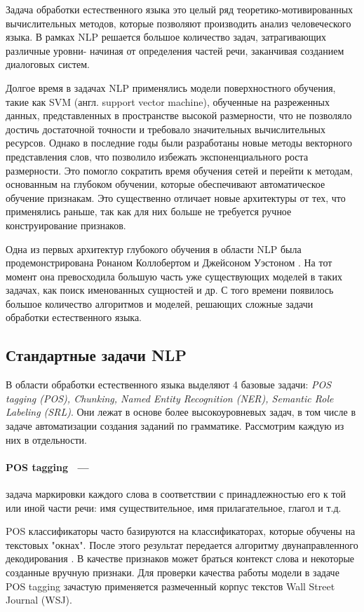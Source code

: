 Задача обработки естественного языка это целый ряд теоретико-мотивированных вычислительных методов, которые позволяют производить анализ человеческого языка. В рамках NLP решается большое количество задач, затрагивающих различные уровни- начиная от определения частей речи, заканчивая созданием диалоговых систем.

Долгое время в задачах NLP применялись модели поверхностного обучения, такие как SVM (англ. support vector machine), обученные на разреженных данных, представленных в пространстве высокой размерности, что не позволяло достичь достаточной точности и требовало значительных вычислительных ресурсов. Однако в последние годы были разработаны новые методы векторного представления слов, что позволило избежать экспоненциального роста размерности. Это помогло сократить время обучения сетей и перейти к методам, основанным на глубоком обучении, которые обеспечивают автоматическое обучение признакам. Это существенно отличает новые архитектуры от тех, что применялись раньше, так как для них больше не требуется ручное конструирование признаков.

Одна из первых архитектур глубокого обучения в области NLP была продемонстрирована Ронаном Коллобертом и Джейсоном Уэстоном \autocite{DBLP:journals/corr/abs-1103-0398}. На тот момент она превосходила большую часть уже существующих моделей в таких задачах, как поиск именованных сущностей и др. С того времени появилось большое количество алгоритмов и моделей, решающих сложные задачи обработки естественного языка.

\subsection{Стандартные задачи NLP}
В области обработки естественного языка выделяют 4 базовые задачи:\emph{ POS tagging (POS), Chunking, Named Entity Recognition (NER), Semantic Role Labeling (SRL)}. Они лежат в основе более высокоуровневых задач, в том числе в задаче автоматизации создания заданий по грамматике. Рассмотрим каждую из них в отдельности.
\paragraph{POS tagging ~---}задача маркировки каждого слова в соответствии с принадлежностью его к той или иной части речи: имя существительное, имя прилагательное, глагол и т.д.

POS классификаторы часто базируются на классификаторах, которые обучены на текстовых "окнах". После этого результат передается алгоритму двунаправленного декодирования \autocite{watanabe-sumita-2002-bidirectional}. В качестве признаков может браться контекст слова и некоторые созданные вручную признаки.
Для проверки качества работы модели в задаче POS tagging зачастую применяется размеченный корпус текстов Wall Street Journal (WSJ).
